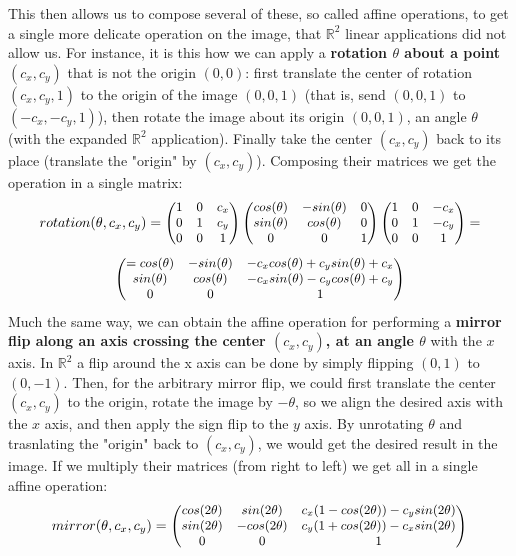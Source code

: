 \documentclass[11pt, a4paper, twoside]{article} %
\newcommand{\R}{\mathbb{R}} %
\begin{document}
{This then allows us to compose several of these, so called affine operations, to get a single more delicate operation on the image, that $\R^2$ linear applications did not allow us. For instance, it is this how we can apply a {\bf rotation $\theta$ about a point $(c_x,c_y)$} that is not the origin $(0,0)$: first translate the center of rotation $(c_x,c_y,1)$ to the origin of the image $(0,0,1)$ (that is, send $(0,0,1)$ to $(-c_x,-c_y,1)$), then rotate the image about its origin $(0,0,1)$, an angle $\theta$ (with the expanded $\R^2$ application). Finally take the center $(c_x,c_y)$ back to its place (translate the "origin" by $(c_x,c_y)$). Composing their matrices we get the operation in a single matrix:
\begin{equation}\small
rotation(\theta, c_x,c_y) = \begin{pmatrix}
1 & 0 & c_x\\
0 & 1 & c_y\\
0 & 0 & 1
\end{pmatrix}\begin{pmatrix}
cos(\theta) & -sin(\theta) & 0\\
sin(\theta) & cos(\theta) & 0\\
0 & 0 & 1
\end{pmatrix}\begin{pmatrix}
1 & 0 & -c_x\\
0 & 1 & -c_y\\
0 & 0 & 1
\end{pmatrix}=
\end{equation}
\begin{equation}
\small\begin{pmatrix}
=cos(\theta) & -sin(\theta) & -c_xcos(\theta)+c_ysin(\theta)+c_x\\
sin(\theta) & cos(\theta) & -c_xsin(\theta)-c_ycos(\theta)+c_y\\
0 & 0 & 1
\end{pmatrix}
\end{equation}
Much the same way, we can obtain the affine operation for performing a {\bf mirror flip along an axis crossing the center $(c_x,c_y)$, at an angle $\theta$} with the $x$ axis. In $\R^2$ a flip around the x axis can be done by simply flipping $(0,1)$ to $(0,-1)$. Then, for the arbitrary mirror flip, we could first translate the center $(c_x,c_y)$ to the origin, rotate the image by $-\theta$, so we align the desired axis with the $x$ axis, and then apply the sign flip to the $y$ axis. By unrotating $\theta$ and trasnlating the "origin" back to $(c_x,c_y)$, we would get the desired result in the image. If we multiply their matrices (from right to left) we get all in a single affine operation:
\begin{equation}\label{mirror}\small
mirror(\theta,c_x,c_y)=\begin{pmatrix}
cos(2\theta) & sin(2\theta) & c_x(1-cos(2\theta))-c_ysin(2\theta) \\
sin(2\theta) & -cos(2\theta) & c_y(1+cos(2\theta))-c_xsin(2\theta)\\
0 & 0& 1
\end{pmatrix}
\end{equation}

}
\end{document}
